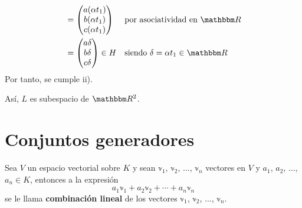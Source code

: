 \begin{example}
\begin{enumerate}[label=\roman*)]
\begin{align*}
            & = \begin{pmatrix} a (\alpha t_1) \\ b (\alpha t_1) \\ c (\alpha t_1) \end{pmatrix} && \text{por asociatividad en $\RR$} \\
            & = \begin{pmatrix} a\delta \\ b\delta \\ c\delta \end{pmatrix} \in H  && \text{siendo $\delta = \alpha t_1 \in \RR$}
        \end{align*}
        Por tanto, se cumple ii).
    \end{enumerate}
    Así, $L$ es subespacio de $\RR[2]$.
\end{example}

\section{Conjuntos generadores}

\begin{definition}
    Sea $V$ un espacio vectorial sobre $K$ y sean $\mathbb{v}_1$, $\mathbb{v}_2$, $\dots$, $\mathbb{v}_n$ vectores en $V$ y $a_1$, $a_2$, $\dots$, $a_n \in K$, entonces a la expresión
    $$a_1 \mathbb{v}_1 + a_2 \mathbb{v}_2 + \cdots + a_n \mathbb{v}_n$$
    se le llama \textbf{combinación lineal} de los vectores $\mathbb{v}_1$, $\mathbb{v}_2$, $\dots$, $\mathbb{v}_n$.
\end{definition}

